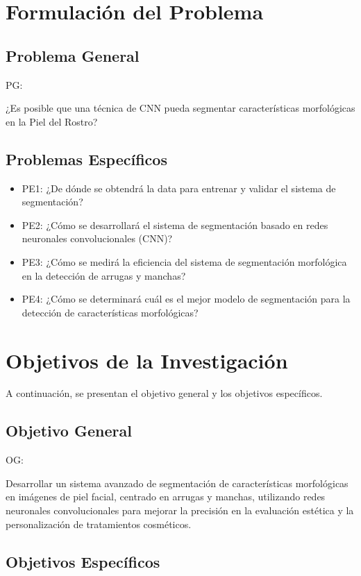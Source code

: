 \section{Formulación del Problema}

\subsection{Problema General}
PG: \newcommand{\ProblemaGeneral}{
¿Es posible que una técnica de CNN pueda segmentar características morfológicas en la Piel del Rostro?
}
\ProblemaGeneral
\subsection{Problemas Específicos}
\newcommand{\Pbone}{
¿De dónde se obtendrá la data para entrenar y validar el sistema de segmentación?
}
\newcommand{\Pbtwo}{
¿Cómo se desarrollará el sistema de segmentación basado en redes neuronales convolucionales (CNN)?
}
\newcommand{\Pbthree}{
¿Cómo se medirá la eficiencia del sistema de segmentación morfológica en la detección de arrugas y manchas?
}

\newcommand{\Pbfour}{
¿Cómo se determinará cuál es el mejor modelo de segmentación para la detección de características morfológicas?
}

\begin{itemize}
	\item PE1: {\Pbone}
	\item PE2: {\Pbtwo}
	\item PE3: {\Pbthree}
	\item PE4: {\Pbfour}
\end{itemize}

\section{Objetivos de la Investigación}
A continuación, se presentan el objetivo general y los objetivos específicos.
\subsection{Objetivo General}
OG: \newcommand{\ObjetivoGeneral}{
	Desarrollar un sistema avanzado de segmentación de características morfológicas en imágenes de piel facial, centrado en arrugas y manchas, utilizando redes neuronales convolucionales para mejorar la precisión en la evaluación estética y la personalización de tratamientos cosméticos.
}
\ObjetivoGeneral
\subsection{Objetivos Específicos}
\newcommand{\Objone}{
Recopilar y preparar un conjunto de datos de imágenes faciales, asegurando que contenga suficiente variedad en términos de diferentes tipos de piel y problemas cutáneos (arrugas y manchas), para entrenar y validar el sistema de segmentación.
}

